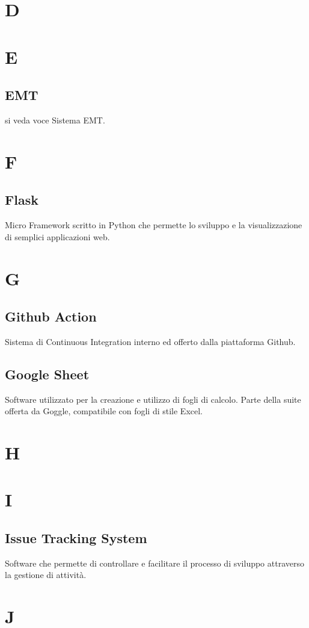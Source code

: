 \section{D}
\section{E}
\subsection{EMT}
si veda voce Sistema EMT.
\newpage
\section{F}
\subsection{Flask}
Micro Framework scritto in Python che permette lo sviluppo e la visualizzazione di semplici applicazioni web.
\newpage
\section{G}
\subsection{Github Action}
Sistema di Continuous Integration interno ed offerto dalla piattaforma Github.
\subsection{Google Sheet}
Software utilizzato per la creazione e utilizzo di fogli di calcolo. Parte della suite offerta da Goggle, compatibile con fogli di stile Excel.
\newpage
\section{H}
\section{I}
\subsection{Issue Tracking System}
Software che permette di controllare e facilitare il processo di sviluppo attraverso la gestione di attività.
\newpage
\section{J}
